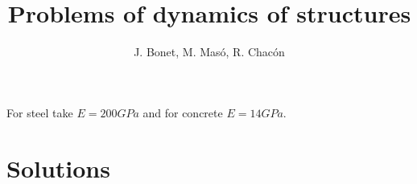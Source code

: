\documentclass{problems}
\title{Problems of dynamics of structures}
\author{J. Bonet, M. Masó, R. Chacón}
\begin{document}
\maketitle

For steel take $E=200GPa$ and for concrete $E=14GPa$.





\newpage
\section{Solutions}





\printbibliography
\end{document}
